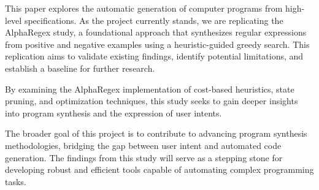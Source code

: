 
\pagestyle{plain}
\setcounter{page}{1}



\indent\indent This paper explores the automatic generation of computer programs from high-level specifications. As the project currently stands, we are replicating the AlphaRegex study, a foundational approach that synthesizes regular expressions from positive and negative examples using a heuristic-guided greedy search. This replication aims to validate existing findings, identify potential limitations, and establish a baseline for further research.

\indent\indent By examining the AlphaRegex implementation of cost-based heuristics, state pruning, and optimization techniques, this study seeks to gain deeper insights into program synthesis and the expression of user intents. 


\indent\indent The broader goal of this project is to contribute to advancing program synthesis methodologies, bridging the gap between user intent and automated code generation. The findings from this study will serve as a stepping stone for developing robust and efficient tools capable of automating complex programming tasks.
 

\pagebreak{}
